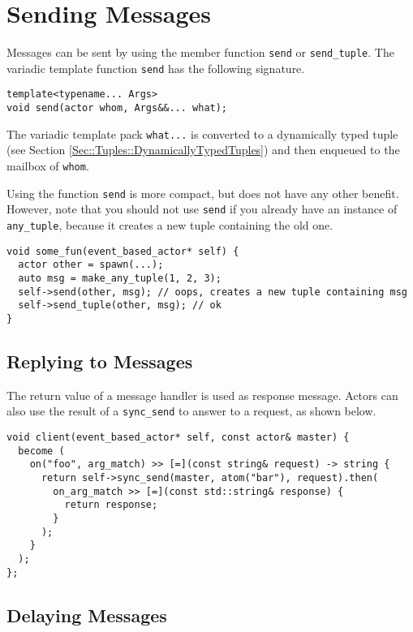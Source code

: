 \section{Sending Messages}
\label{Sec::Send}

Messages can be sent by using the member function \lstinline^send^ or \lstinline^send_tuple^.
The variadic template function \lstinline^send^ has the following signature.

\begin{lstlisting}
template<typename... Args>
void send(actor whom, Args&&... what);
\end{lstlisting}

The variadic template pack \lstinline^what...^ is converted to a dynamically typed tuple (see Section \ref{Sec::Tuples::DynamicallyTypedTuples}) and then enqueued to the mailbox of \lstinline^whom^.

Using the function \lstinline^send^ is more compact, but does not have any other benefit.
However, note that you should not use \lstinline^send^ if you already have an instance of \lstinline^any_tuple^, because it creates a new tuple containing the old one.

\begin{lstlisting}
void some_fun(event_based_actor* self) {
  actor other = spawn(...);
  auto msg = make_any_tuple(1, 2, 3);
  self->send(other, msg); // oops, creates a new tuple containing msg
  self->send_tuple(other, msg); // ok
}
\end{lstlisting}

\clearpage
\subsection{Replying to Messages}
\label{Sec::Send::Reply}

The return value of a message handler is used as response message.
Actors can also use the result of a \lstinline^sync_send^ to answer to a request, as shown below.

\begin{lstlisting}
void client(event_based_actor* self, const actor& master) {
  become (
    on("foo", arg_match) >> [=](const string& request) -> string {
      return self->sync_send(master, atom("bar"), request).then(
        on_arg_match >> [=](const std::string& response) {
          return response;
        }
      );
    }
  );
};
\end{lstlisting}

\subsection{Delaying Messages}

